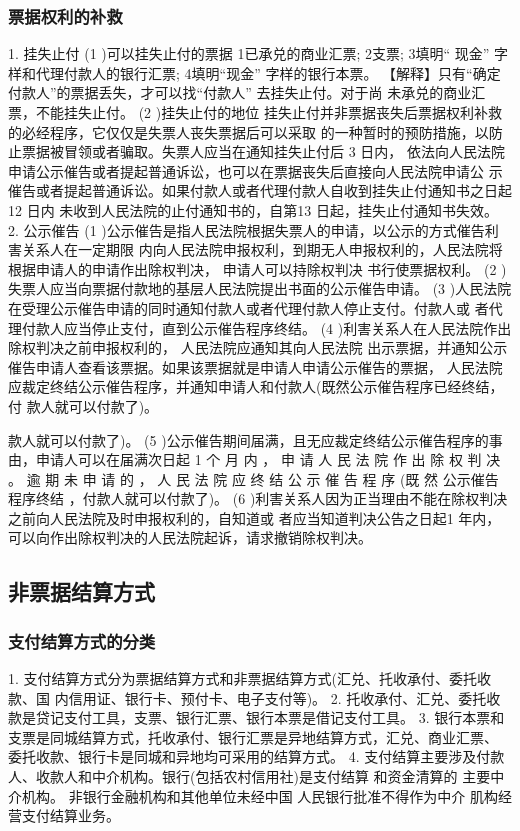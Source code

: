 \documentclass[UTF8,12pt]{ctexart}
\numberwithin{equation}{section} %
\numberwithin{figure}{section}
\numberwithin{table}{section}
\begin{document}
	
	\subsubsection{票据权利的补救}
	1. 挂失止付
	(1 )可以挂失止付的票据
	1已承兑的商业汇票;
	2支票;
	3填明“ 现金” 字样和代理付款人的银行汇票;
	4填明“现金” 字样的银行本票。
	【解释】只有“确定付款人”的票据丢失，才可以找“付款人” 去挂失止付。对于尚
	未承兑的商业汇票，不能挂失止付。
	(2 )挂失止付的地位
	挂失止付并非票据丧失后票据权利补救的必经程序，它仅仅是失票人丧失票据后可以采取
	的一种暂时的预防措施，以防止票据被冒领或者骗取。失票人应当在通知挂失止付后 3 日内，
	依法向人民法院申请公示催告或者提起普通诉讼，也可以在票据丧失后直接向人民法院申请公
	示催告或者提起普通诉讼。如果付款人或者代理付款人自收到挂失止付通知书之日起 12 日内
	未收到人民法院的止付通知书的，自第13 日起，挂失止付通知书失效。
	2. 公示催告
	(1 )公示催告是指人民法院根据失票人的申请，以公示的方式催告利害关系人在一定期限
	内向人民法院申报权利，到期无人申报权利的，人民法院将根据申请人的申请作出除权判决，
	申请人可以持除权判决 书行使票据权利。
	(2 )失票人应当向票据付款地的基层人民法院提出书面的公示催告申请。
	(3 )人民法院在受理公示催告申请的同时通知付款人或者代理付款人停止支付。付款人或
	者代理付款人应当停止支付，直到公示催告程序终结。
	(4 )利害关系人在人民法院作出除权判决之前申报权利的， 人民法院应通知其向人民法院
	出示票据，并通知公示催告申请人查看该票据。如果该票据就是申请人申请公示催告的票据，
	人民法院应裁定终结公示催告程序，并通知申请人和付款人(既然公示催告程序已经终结，付
	款人就可以付款了)。
	
	
	款人就可以付款了)。
	(5 )公示催告期间届满，且无应裁定终结公示催告程序的事由，申请人可以在届满次日起
	1 个 月 内 ， 申 请 人 民 法 院 作 出 除 权 判 决 。 逾 期 未 申 请 的 ， 人 民 法 院 应 终 结 公 示 催 告 程 序 (既 然
	公示催告程序终结 ，付款人就可以付款了)。
	(6 )利害关系人因为正当理由不能在除权判决之前向人民法院及时申报权利的，自知道或
	者应当知道判决公告之日起1 年内，可以向作出除权判决的人民法院起诉，请求撤销除权判决。
	
	\subsection{非票据结算方式}
	
	\subsubsection{支付结算方式的分类} 
	1. 支付结算方式分为票据结算方式和非票据结算方式(汇兑、托收承付、委托收款、国
	内信用证、银行卡、预付卡、电子支付等)。
	2. 托收承付、汇兑、委托收款是贷记支付工具，支票、银行汇票、银行本票是借记支付工具。
	3. 银行本票和支票是同城结算方式，托收承付、银行汇票是异地结算方式，汇兑、商业汇票、
	委托收款、银行卡是同城和异地均可采用的结算方式。
	4. 支付结算主要涉及付款人、收款人和中介机构。银行(包括农村信用社)是支付结算
	和资金清算的 主要中介机构。 非银行金融机构和其他单位未经中国 人民银行批准不得作为中介
	肌构经营支付结算业务。
	
\end{document}
